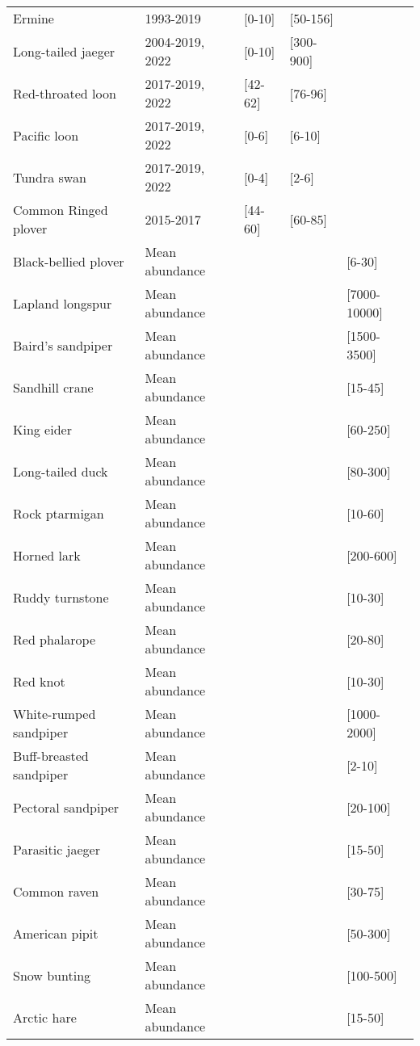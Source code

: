 \begin{table}[ht]
\begin{tabularx}{\textwidth}{lllll}
  Ermine & 1993-2019 & [0-10] & [50-156] &  \\ 
  Long-tailed jaeger & 2004-2019, 2022 & [0-10] & [300-900] &  \\ 
  Red-throated loon & 2017-2019, 2022 & [42-62] & [76-96] &  \\ 
  Pacific loon & 2017-2019, 2022 & [0-6] & [6-10] &  \\ 
  Tundra swan & 2017-2019, 2022 & [0-4] & [2-6] &  \\ 
  Common Ringed plover & 2015-2017 & [44-60] & [60-85] &  \\ 
  Black-bellied plover & Mean abundance &  &  & [6-30] \\ 
  Lapland longspur & Mean abundance &  &  & [7000-10000] \\ 
  Baird's sandpiper & Mean abundance &  &  & [1500-3500] \\ 
  Sandhill crane & Mean abundance &  &  & [15-45] \\ 
  King eider & Mean abundance &  &  & [60-250] \\ 
  Long-tailed duck & Mean abundance &  &  & [80-300] \\ 
  Rock ptarmigan & Mean abundance &  &  & [10-60] \\ 
  Horned lark & Mean abundance &  &  & [200-600] \\ 
  Ruddy turnstone & Mean abundance &  &  & [10-30] \\ 
  Red phalarope & Mean abundance &  &  & [20-80] \\ 
  Red knot & Mean abundance &  &  & [10-30] \\ 
  White-rumped sandpiper & Mean abundance &  &  & [1000-2000] \\ 
  Buff-breasted sandpiper & Mean abundance &  &  & [2-10] \\ 
  Pectoral sandpiper & Mean abundance &  &  & [20-100] \\ 
  Parasitic jaeger & Mean abundance &  &  & [15-50] \\ 
  Common raven & Mean abundance &  &  & [30-75] \\ 
  American pipit & Mean abundance &  &  & [50-300] \\ 
  Snow bunting & Mean abundance &  &  & [100-500] \\ 
  Arctic hare & Mean abundance &  &  & [15-50] \\ 
   \hline
\end{tabularx}
\endgroup
\end{table}
